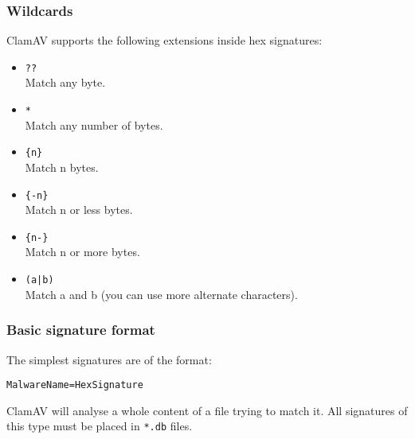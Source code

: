 \documentclass[a4paper,titlepage,12pt]{article}
\begin{document}
    \subsubsection{Wildcards}
    ClamAV supports the following extensions inside hex signatures:
    \begin{itemize}
	\item \verb+??+\\
	Match any byte.
	\item \verb+*+\\
	Match any number of bytes.
	\item \verb+{n}+\\
	Match n bytes.
	\item \verb+{-n}+\\
	Match n or less bytes.
	\item \verb+{n-}+\\
	Match n or more bytes.
	\item \verb+(a|b)+\\
	Match a and b (you can use more alternate characters).
    \end{itemize}

    \subsubsection{Basic signature format}
    The simplest signatures are of the format:
    \begin{verbatim}
MalwareName=HexSignature
    \end{verbatim}
    ClamAV will analyse a whole content of a file trying to match it. All
    signatures of this type must be placed in \verb+*.db+ files.
\end{document}
